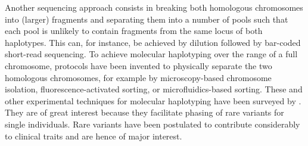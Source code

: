 Another sequencing approach consists in breaking both homologous chromosomes into (larger) fragments and 
separating them into a number of pools such that each pool is unlikely to contain fragments from the same locus of both haplotypes.
This can, for instance, be achieved by dilution followed by bar-coded short-read sequencing.
To achieve molecular haplotyping over the range of a full chromosome, 
protocols have been invented to physically separate the two homologous chromosomes, for example by microscopy-based chromosome isolation, fluorescence-activated sorting, or microfluidics-based sorting.
These and other experimental techniques for molecular haplotyping have been surveyed by \cite{Snyder2015}.
They are of great interest because they facilitate phasing of rare variants for single individuals.
Rare variants have been postulated to contribute considerably to clinical traits and are hence of major interest.


